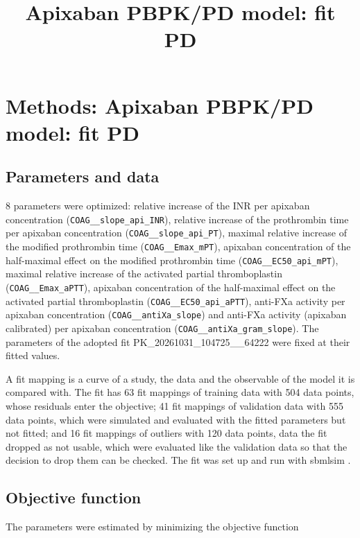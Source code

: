 \documentclass{article}
\title{Apixaban PBPK/PD model: fit PD}
\date{}
\begin{document}
\maketitle

\section{Methods: Apixaban PBPK/PD model: fit PD}

\subsection{Parameters and data}

8 parameters were optimized: relative increase of the INR per apixaban concentration (\texttt{COAG\_\_slope\_api\_INR}), relative increase of the prothrombin time per apixaban concentration (\texttt{COAG\_\_slope\_api\_PT}), maximal relative increase of the modified prothrombin time (\texttt{COAG\_\_Emax\_mPT}), apixaban concentration of the half-maximal effect on the modified prothrombin time (\texttt{COAG\_\_EC50\_api\_mPT}), maximal relative increase of the activated partial thromboplastin (\texttt{COAG\_\_Emax\_aPTT}), apixaban concentration of the half-maximal effect on the activated partial thromboplastin (\texttt{COAG\_\_EC50\_api\_aPTT}), anti-FXa activity per apixaban concentration (\texttt{COAG\_\_antiXa\_slope}) and anti-FXa activity (apixaban calibrated) per apixaban concentration (\texttt{COAG\_\_antiXa\_gram\_slope}). The parameters of the adopted fit PK\_20261031\_104725\_\_64222 were fixed at their fitted values.

A fit mapping is a curve of a study, the data and the observable of the model it is compared with. The fit has 63 fit mappings of training data with 504 data points, whose residuals enter the objective; 41 fit mappings of validation data with 555 data points, which were simulated and evaluated with the fitted parameters but not fitted; and 16 fit mappings of outliers with 120 data points, data the fit dropped as not usable, which were evaluated like the validation data so that the decision to drop them can be checked. The fit was set up and run with sbmlsim \cite{Koenig2026_sbmlsim}.

\subsection{Objective function}

The parameters were estimated by minimizing the objective function
\end{document}
